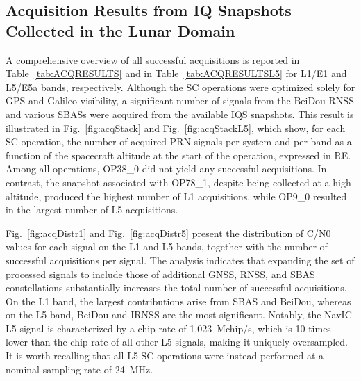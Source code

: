 \documentclass{IEEEtaes}
\begin{document}
\subsection{Acquisition Results from IQ Snapshots Collected in the Lunar Domain}
A comprehensive overview of all successful acquisitions is reported in Table~\ref{tab:ACQRESULTS} and in Table~\ref{tab:ACQRESULTSL5} for L1/E1 and L5/E5a bands, respectively. Although the \gls{SC} operations were optimized solely for \gls{GPS} and Galileo visibility, a significant number of signals from the BeiDou \gls{RNSS} and various \glspl{SBAS} were acquired from the available \gls{IQS} snapshots. This result is illustrated in Fig.~\ref{fig:acqStack} and Fig.~\ref{fig:acqStackL5}, which show, for each \gls{SC} operation, the number of acquired \gls{PRN} signals per system and per band as a function of the spacecraft altitude at the start of the operation, expressed in \gls{RE}. Among all operations, OP38\_0 did not yield any successful acquisitions. In contrast, the snapshot associated with OP78\_1, despite being collected at a high altitude, produced the highest number of L1 acquisitions, while OP9\_0 resulted in the largest number of L5 acquisitions.

Fig.~\ref{fig:acqDistr1} and Fig.~\ref{fig:acqDistr5} present the distribution of \gls{C/N0} values for each signal on the  L1 and L5 bands, together with the number of successful acquisitions per signal. The analysis indicates that expanding the set of processed signals to include those of additional \gls{GNSS}, \gls{RNSS}, and \gls{SBAS} constellations substantially increases the total number of successful acquisitions. On the L1 band, the largest contributions arise from \gls{SBAS} and BeiDou, whereas on the L5 band, BeiDou and \gls{IRNSS} are the most significant. Notably, the NavIC L5 signal is characterized by a chip rate of 1.023~Mchip/s, which is 10 times lower than the chip rate of all other L5 signals, making it uniquely oversampled. It is worth recalling that all L5 \gls{SC} operations were instead performed at a nominal sampling rate of 24~MHz.
\end{document}
